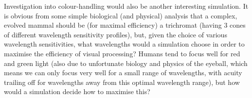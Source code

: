 \documentclass[12pt]{article}
\begin{document}
Investigation into colour-handling would also be another interesting simulation. It is obvious from some simple biological (and physical) analysis that a complex, evolved mammal should be (for maximal efficiency) a trichromat (having 3 cones of different wavelength sensitivity profiles), but, given the choice of various wavelength sensitivities, what wavelengths would a simulation choose in order to maximise the efficiency of visual processing? Humans tend to focus well for red and green light (also due to unfortunate biology and physics of the eyeball, which means we can only focus very well for a small range of wavelengths, with acuity trailing off for wavelengths away from this optimal wavelength range), but how would a simulation decide how to maximise this?
\end{document}
